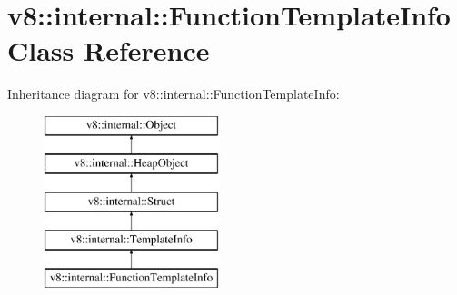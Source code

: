 \hypertarget{classv8_1_1internal_1_1_function_template_info}{}\section{v8\+:\+:internal\+:\+:Function\+Template\+Info Class Reference}
\label{classv8_1_1internal_1_1_function_template_info}
Inheritance diagram for v8\+:\+:internal\+:\+:Function\+Template\+Info\+:\begin{figure}[H]
\begin{center}
\leavevmode
\includegraphics[height=5.000000cm]{classv8_1_1internal_1_1_function_template_info}
\end{center}
\end{figure}
